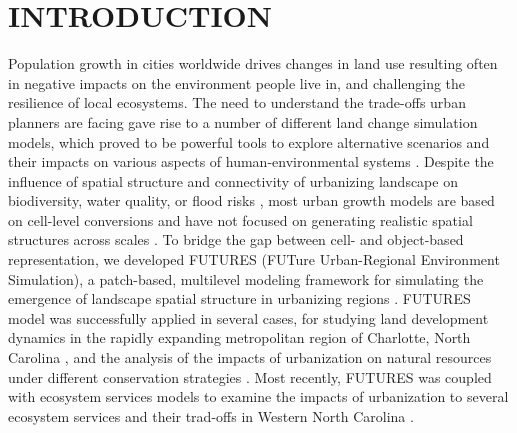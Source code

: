 \documentclass{isprs}
\begin{document}
\keywords{}

\maketitle


\section{INTRODUCTION}\label{INTRODUCTION}

Population growth in cities worldwide drives changes in land use
resulting often in negative impacts on the environment people live in, and
challenging the resilience of local ecosystems.
The need to understand the trade-offs urban planners are facing
gave rise to a number of different land change simulation models,
which proved to be powerful tools to explore
alternative scenarios and their impacts on various aspects of human-environmental systems
\cite{chaudhuri2013sleuth,verburg2002modeling,sohl2007fore,waddell2002urbansim}.
Despite the influence of
spatial structure and connectivity of urbanizing landscape on
biodiversity, water quality, or flood risks \cite{alberti2005effects},
most urban growth models are based on cell-level conversions and 
have not focused on generating realistic spatial structures across scales \cite{jantz2005analysis}.
To bridge the gap between cell- and object-based representation, we developed
FUTURES (FUTure Urban-Regional Environment Simulation), a patch-based, multilevel
modeling framework for simulating the emergence of landscape spatial structure
in urbanizing regions \cite{Meentemeyer2012}.
%
FUTURES model was successfully applied in several cases, for studying land development dynamics in the rapidly
expanding metropolitan region of Charlotte, North Carolina \cite{Meentemeyer2012}, and the analysis of the impacts
of urbanization on natural resources under different conservation strategies \cite{Dorning2015}.
Most recently, FUTURES was coupled with ecosystem services models to examine the impacts of urbanization to several
ecosystem services and their trad-offs in Western North Carolina \cite{Brian2016}.
\end{document}
